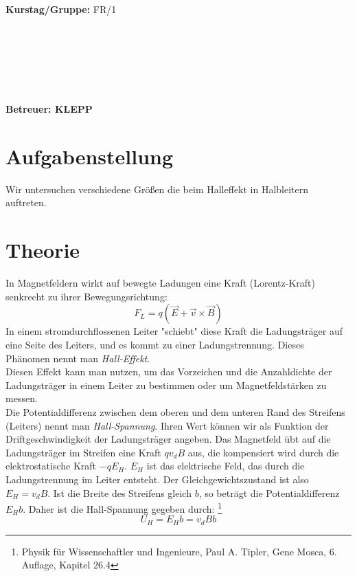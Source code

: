 \documentclass[12pt,a4paper,twopage]{article}
\begin{document}
\begin{verbatim}


\end{verbatim}
			\begin{flushleft}
			\textbf{\Large{Kurstag/Gruppe:}} \Large{FR/1}
			\end{flushleft}

\begin{verbatim}






\end{verbatim}
			\begin{flushleft}
			\LARGE{\textbf{Betreuer:\Large{ KLEPP }}}		
			\end{flushleft}
			
\pagebreak			
			
\section{Aufgabenstellung}
Wir untersuchen verschiedene Größen die beim Halleffekt in Halbleitern auftreten.
\section{Theorie}
In Magnetfeldern wirkt auf bewegte Ladungen eine Kraft (Lorentz-Kraft) senkrecht zu ihrer Bewegungsrichtung:
$$F_L=q(\vec{E}+\vec{v}\times \vec{B})$$
In einem stromdurchflossenen Leiter "schiebt" diese Kraft die Ladungsträger auf eine Seite des Leiters, und es kommt zu einer Ladungstrennung. Dieses Phänomen nennt man \textit{Hall-Effekt}.\\
Diesen Effekt kann man nutzen, um das Vorzeichen und die Anzahldichte der Ladungsträger in einem Leiter zu bestimmen oder um Magnetfeldstärken zu messen.\\
Die Potentialdifferenz zwischen dem oberen und dem unteren Rand des Streifens (Leiters) nennt man \textit{Hall-Spannung}. Ihren Wert können wir als Funktion der Driftgeschwindigkeit der Ladungsträger angeben. Das Magnetfeld übt auf die Ladungsträger im Streifen eine Kraft $q v_d B$ aus, die kompensiert wird durch die elektrostatische Kraft $-q E_H$. $E_H$ ist das elektrische Feld, das durch die Ladungstrennung im Leiter entsteht. Der Gleichgewichtszustand ist also $E_H=v_d B$. Ist die Breite des Streifens gleich $b$, so beträgt die Potentialdifferenz $E_H b$. Daher ist die Hall-Spannung gegeben durch: \footnote{Physik für Wissenschaftler und Ingenieure, Paul A. Tipler, Gene Mosca, 6. Auflage, Kapitel 26.4}
$$U_H=E_H b = v_d B b$$
\end{document}
